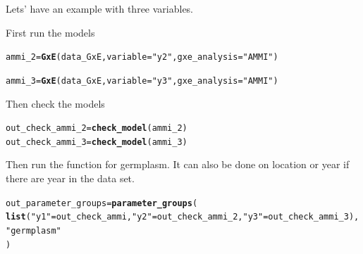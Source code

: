 \documentclass{article}\usepackage[]{graphicx}\usepackage[]{color}
\makeatletter
\newcommand{\hlstr}[1]{\textcolor[rgb]{0.192,0.494,0.8}{#1}}%
\newcommand{\hlstd}[1]{\textcolor[rgb]{0.345,0.345,0.345}{#1}}%
\newcommand{\hlkwb}[1]{\textcolor[rgb]{0.69,0.353,0.396}{#1}}%
\newcommand{\hlkwc}[1]{\textcolor[rgb]{0.333,0.667,0.333}{#1}}%
\newcommand{\hlkwd}[1]{\textcolor[rgb]{0.737,0.353,0.396}{\textbf{#1}}}%
\newenvironment{kframe}{%
 \def\at@end@of@kframe{}%
 \ifinner\ifhmode%
  \def\at@end@of@kframe{\end{minipage}}%
  \begin{minipage}{\columnwidth}%
 \fi\fi%
 \def\FrameCommand##1{\hskip\@totalleftmargin \hskip-\fboxsep
 \colorbox{shadecolor}{##1}\hskip-\fboxsep
     \hskip-\linewidth \hskip-\@totalleftmargin \hskip\columnwidth}%
 \MakeFramed {\advance\hsize-\width
   \@totalleftmargin\z@ \linewidth\hsize
   \@setminipage}}%
 {\par\unskip\endMakeFramed%
 \at@end@of@kframe}
\newenvironment{knitrout}{}{} %
\makeatother
\begin{document}
Lets' have an example with three variables.

First run the models
\begin{knitrout}
\color{fgcolor}\begin{kframe}
\begin{alltt}
\hlstd{ammi_2} \hlkwb{=} \hlkwd{GxE}\hlstd{(data_GxE,} \hlkwc{variable} \hlstd{=} \hlstr{"y2"}\hlstd{,} \hlkwc{gxe_analysis} \hlstd{=} \hlstr{"AMMI"}\hlstd{)}
\end{alltt}


{\ttfamily\noindent\itshape\color{messagecolor}{\#\# AMMI model done for y2}}\begin{alltt}
\hlstd{ammi_3} \hlkwb{=} \hlkwd{GxE}\hlstd{(data_GxE,} \hlkwc{variable} \hlstd{=} \hlstr{"y3"}\hlstd{,} \hlkwc{gxe_analysis} \hlstd{=} \hlstr{"AMMI"}\hlstd{)}
\end{alltt}


{\ttfamily\noindent\itshape\color{messagecolor}{\#\# AMMI model done for y3}}\end{kframe}
\end{knitrout}

Then check the models
\begin{knitrout}
\color{fgcolor}\begin{kframe}
\begin{alltt}
\hlstd{out_check_ammi_2} \hlkwb{=} \hlkwd{check_model}\hlstd{(ammi_2)}
\hlstd{out_check_ammi_3} \hlkwb{=} \hlkwd{check_model}\hlstd{(ammi_3)}
\end{alltt}
\end{kframe}
\end{knitrout}

Then run the function for germplasm. It can also be done on location or year if there are year in the data set.

\begin{knitrout}
\color{fgcolor}\begin{kframe}
\begin{alltt}
\hlstd{out_parameter_groups} \hlkwb{=} \hlkwd{parameter_groups}\hlstd{(}
  \hlkwd{list}\hlstd{(}\hlstr{"y1"} \hlstd{= out_check_ammi,} \hlstr{"y2"} \hlstd{= out_check_ammi_2,} \hlstr{"y3"} \hlstd{= out_check_ammi_3),}
  \hlstr{"germplasm"}
  \hlstd{)}
\end{alltt}
\end{kframe}
\end{knitrout}
\end{document}

